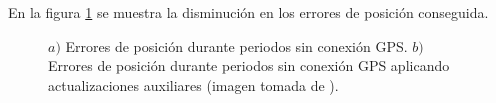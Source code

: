 En la figura \ref{NAVI} se muestra la disminución en los errores de posición conseguida.


\begin{figure}[H]
\caption{$a)$ Errores de posición durante periodos sin conexión GPS. $b)$ Errores de posición durante periodos sin conexión GPS aplicando actualizaciones auxiliares (imagen tomada de \cite{NAVI:NAVI403}).}
\label{NAVI}
\end{figure}

